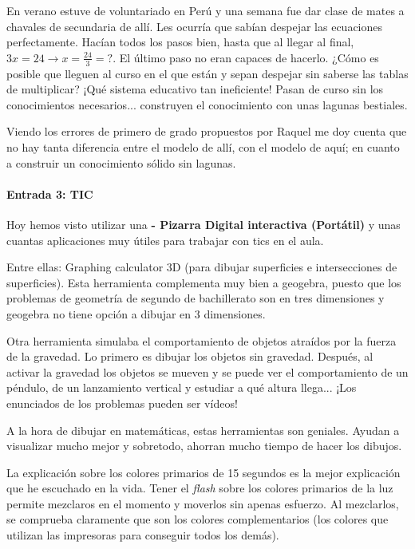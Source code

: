 \documentclass[palatino,nochap]{apuntes}
\begin{document}
En verano estuve de voluntariado en Perú y una semana fue dar clase de mates a chavales de secundaria de allí. 
%
Les ocurría que sabían despejar las ecuaciones perfectamente. Hacían todos los pasos bien, hasta que al llegar al final, $3x = 24 \to x=\frac{24}{3} = ?$. 
%
El último paso no eran capaces de hacerlo. ¿Cómo es posible que lleguen al curso en el que están y sepan despejar sin saberse las tablas de multiplicar? 
%
¡Qué sistema educativo tan ineficiente! 
%
Pasan de curso sin los conocimientos necesarios... construyen el conocimiento con unas lagunas bestiales.

Viendo los errores de primero de grado propuestos por Raquel me doy cuenta que no hay tanta diferencia entre el modelo de allí, con el modelo de aquí; 
%
en cuanto a construir un conocimiento sólido sin lagunas.

\paragraph{Entrada 3: TIC}

Hoy hemos visto utilizar una \textbf{ - Pizarra Digital interactiva (Portátil)} y unas cuantas aplicaciones muy útiles para trabajar con tics en el aula.

Entre ellas: Graphing calculator 3D (para dibujar superficies e intersecciones de superficies).
%
Esta herramienta complementa muy bien a geogebra, puesto que los problemas de geometría de segundo de bachillerato son en tres dimensiones y geogebra no tiene opción a dibujar en 3 dimensiones.

Otra herramienta simulaba el comportamiento de objetos atraídos por la fuerza de la gravedad. 
%
Lo primero es dibujar los objetos sin gravedad. Después, al activar la gravedad los objetos se mueven y se puede ver el comportamiento de un péndulo, de un lanzamiento vertical y estudiar a qué altura llega... ¡Los enunciados de los problemas pueden ser vídeos!

A la hora de dibujar en matemáticas, estas herramientas son geniales. Ayudan a visualizar mucho mejor y sobretodo, ahorran mucho tiempo de hacer los dibujos.

La explicación sobre los colores primarios de 15 segundos es la mejor explicación que he escuchado en la vida. 
%
Tener el \textit{flash} sobre los colores primarios de la luz permite mezclaros en el momento y moverlos sin apenas esfuerzo. 
%
Al mezclarlos, se comprueba claramente que son los colores complementarios (los colores que utilizan las impresoras para conseguir todos los demás).
\end{document}
